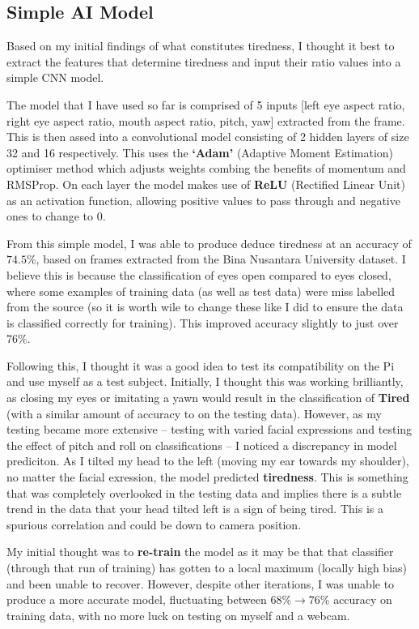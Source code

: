\subsection{Simple AI Model}
Based on my initial findings of what constitutes tiredness, I thought it best to extract the features that determine tiredness and input
their ratio values into a simple CNN model.

The model that I have used so far is comprised of 5 inputs [left eye aspect ratio, right eye aspect ratio, mouth aspect ratio, pitch, yaw]
extracted from the frame. This is then assed into a convolutional model consisting of 2 hidden layers of size 32 and 16 respectively.
This uses the \textbf{‘Adam’} (Adaptive Moment Estimation) optimiser method which adjusts weights combing the benefits of momentum and RMSProp.
On each layer the model makes use of \textbf{ReLU} (Rectified Linear Unit) as an activation function, allowing positive values to pass through
and negative ones to change to 0.

From this simple model, I was able to produce deduce tiredness at an accuracy of $74.5\%$, based on frames extracted from the Bina
Nusantara University dataset. I believe this is because the classification of eyes open compared to eyes closed, where some examples
of training data (as well as test data) were miss labelled from the source (so it is worth wile to change these like I did to ensure
the data is classified correctly for training). This improved accuracy slightly to just over $76\%$.

Following this, I thought it was a good idea to test its compatibility on the Pi and use myself as a test subject. Initially, I thought
this was working brilliantly, as closing my eyes or imitating a yawn would result in the classification of \textbf{Tired} (with a similar amount
of accuracy to on the testing data). However, as my testing became more extensive -- testing with varied facial expressions and
testing the effect of pitch and roll on classifications -- I noticed a discrepancy in model prediciton. As I tilted my head to the left
(moving my ear towards my shoulder), no matter the facial exression, the model predicted \textbf{tiredness}. This is something that was
completely overlooked in the testing data and implies there is a subtle trend in the data that your head tilted left is a sign of being
tired. This is a spurious correlation and could be down to camera position.

My initial thought was to \textbf{re-train} the model as it may be that that classifier (through that run of training) has gotten to a local
maximum (locally high bias) and been unable to recover. However, despite other iterations, I was unable to produce a more accurate model,
fluctuating between $68\% \to 76\%$ accuracy on training data, with no more luck on testing on myself and a webcam.


